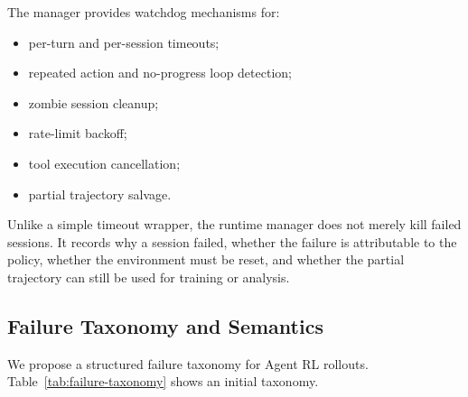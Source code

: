 \documentclass[11pt]{article}
\begin{document}
The manager provides watchdog mechanisms for:

\begin{itemize}[leftmargin=*]
    \item per-turn and per-session timeouts;
    \item repeated action and no-progress loop detection;
    \item zombie session cleanup;
    \item rate-limit backoff;
    \item tool execution cancellation;
    \item partial trajectory salvage.
\end{itemize}

Unlike a simple timeout wrapper, the runtime manager does not merely kill failed sessions.
It records why a session failed, whether the failure is attributable to the policy, whether the environment must be reset, and whether the partial trajectory can still be used for training or analysis.

\subsection{Failure Taxonomy and Semantics}

We propose a structured failure taxonomy for Agent RL rollouts.
Table~\ref{tab:failure-taxonomy} shows an initial taxonomy.
\end{document}
